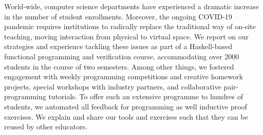 World-wide, computer science departments have experienced a dramatic increase in the number of student enrollments.
Moreover, the ongoing COVID-19 pandemic requires institutions to radically replace the traditional way of on-site teaching,
moving interaction from physical to virtual space.
We report on our strategies and experience tackling these issues
as part of a Haskell-based functional programming and verification course,
accommodating over 2000 students in the course of two semesters.
Among other things,
we fostered engagement with weekly programming competitions
and creative homework projects,
special workshops with industry partners,
and collaborative pair-programming tutorials.
To offer such an extensive programme to hundres of students,
we automated all feedback for programming as well
inductive proof exercises.
We explain and share our tools and exercises such that they can be reused by other educators.

